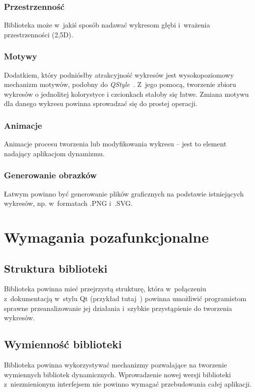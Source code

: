 \documentclass[11pt,twoside,a4paper,final]{article}
\begin{document}
\subsubsection{Przestrzenność}
Biblioteka może w~jakiś sposób nadawać wykresom głębi i~wrażenia przestrzenności (2,5D). 

\subsubsection{Motywy}
Dodatkiem, który podniósłby atrakcyjność wykresów jest wysokopoziomowy mechanizm motywów, podobny do \textit{QStyle}~\cite{qstyle}. Z~jego pomocą, tworzenie zbioru wykresów o jednolitej kolorystyce i czcionkach stałoby się łatwe. Zmiana motywu dla danego wykresu powinna sprowadzać się do prostej operacji.

\subsubsection{Animacje}
Animacje procesu tworzenia lub modyfikowania wykresu -- jest to element nadający aplikacjom dynamizmu.

\subsubsection{Generowanie obrazków}
Łatwym powinno być generowanie plików graficznych na podstawie istniejących wykresów, np. w~formatach .PNG i~.SVG.


\section{Wymagania pozafunkcjonalne}


\subsection{Struktura biblioteki}
Biblioteka powinna mieć przejrzystą strukturę, która w~połączeniu z~dokumentacją w~stylu Qt (przykład tutaj~\cite{qt-doc}) powinna umożliwić programistom sprawne przeanalizowanie jej działania i~szybkie przystąpienie do tworzenia wykresów.

\subsection{Wymienność biblioteki}
Biblioteka powinna wykorzystywać mechanizmy pozwalające na tworzenie wymiennych bibliotek dynamicznych. Wprowadzenie nowej wersji biblioteki z~niezmienionym interfejsem nie powinno wymagać przebudowania całej aplikacji.
\end{document}
